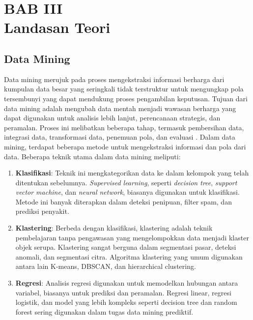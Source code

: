 \section*{\centering BAB III \\ Landasan Teori}


\setcounter{section}{3}
\setcounter{subsection}{0}  %
\setcounter{figure}{0}
\renewcommand{\thefigure}{\thesection.\arabic{figure}}

\subsection{Data Mining}
Data mining merujuk pada proses mengekstraksi informasi berharga dari kumpulan data besar yang seringkali tidak terstruktur untuk mengungkap pola tersembunyi yang dapat mendukung proses pengambilan keputusan. Tujuan dari  data mining adalah mengubah data mentah menjadi wawasan berharga yang dapat digunakan untuk analisis lebih lanjut, perencanaan strategis, dan peramalan. Proses ini melibatkan beberapa tahap, termasuk pembersihan data, integrasi data, transformasi data, penemuan pola, dan evaluasi \cite{DataMiningTechniques}.
Dalam data mining, terdapat beberapa metode untuk mengekstraksi informasi dan pola dari data. Beberapa teknik utama dalam data mining meliputi:
\begin{enumerate}
    \item \textbf{Klasifikasi}: Teknik ini mengkategorikan data ke dalam kelompok yang telah ditentukan sebelumnya. \textit{Supervised learning}, seperti \textit{decision tree}, \textit{support vector machine}, dan \textit{neural network}, biasanya digunakan untuk klasifikasi. Metode ini banyak diterapkan dalam deteksi penipuan, filter spam, dan prediksi penyakit.
    \item \textbf{Klastering}: Berbeda dengan klasifikasi, klastering adalah teknik pembelajaran tanpa pengawasan yang mengelompokkan data menjadi klaster objek serupa. Klastering sangat berguna dalam segmentasi pasar, deteksi anomali, dan segmentasi citra. Algoritma klastering yang umum digunakan antara lain K-means, DBSCAN, dan hierarchical clustering.
    \item \textbf{Regresi}: Analisis regresi digunakan untuk memodelkan hubungan antara variabel, biasanya untuk prediksi dan peramalan. Regresi linear, regresi logistik, dan model yang lebih kompleks seperti decision tree dan random forest sering digunakan dalam tugas data mining prediktif.
\end{enumerate}
 
